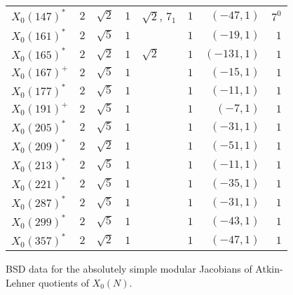 \documentclass{amsart}
\begin{document}
\begin{figure}[tbp]
\begin{tabular}{lllllrrr}
			$X_0(147)^*$     & $2$ & $\sqrt{2}$  & $1$   & $\sqrt{2}$, $7_1$ & $1$ & $(-47, 1)$  & $7^0$  \\
			$X_0(161)^*$     & $2$ & $\sqrt{5}$  & $1$   &                   & $1$ & $(-19, 1)$  & $1$    \\
			$X_0(165)^*$     & $2$ & $\sqrt{2}$  & $1$   & $\sqrt{2}$        & $1$ & $(-131,1)$  & $1$    \\
			$X_0(167)^+$     & $2$ & $\sqrt{5}$  & $1$   &                   & $1$ & $(-15, 1)$  & $1$    \\
			$X_0(177)^*$     & $2$ & $\sqrt{5}$  & $1$   &                   & $1$ & $(-11, 1)$  & $1$    \\
			$X_0(191)^+$     & $2$ & $\sqrt{5}$  & $1$   &                   & $1$ & $(-7,  1)$  & $1$    \\
			$X_0(205)^*$     & $2$ & $\sqrt{5}$  & $1$   &                   & $1$ & $(-31, 1)$  & $1$    \\
			$X_0(209)^*$     & $2$ & $\sqrt{2}$  & $1$   &                   & $1$ & $(-51, 1)$  & $1$    \\
			$X_0(213)^*$     & $2$ & $\sqrt{5}$  & $1$   &                   & $1$ & $(-11, 1)$  & $1$    \\
			$X_0(221)^*$     & $2$ & $\sqrt{5}$  & $1$   &                   & $1$ & $(-35, 1)$  & $1$    \\
			$X_0(287)^*$     & $2$ & $\sqrt{5}$  & $1$   &                   & $1$ & $(-31, 1)$  & $1$    \\
			$X_0(299)^*$     & $2$ & $\sqrt{5}$  & $1$   &                   & $1$ & $(-43, 1)$  & $1$    \\
			$X_0(357)^*$     & $2$ & $\sqrt{2}$  & $1$   &                   & $1$ & $(-47, 1)$  & $1$    \\
			\bottomrule
		\end{tabular}
		\caption{BSD data for the absolutely simple modular Jacobians of Atkin-Lehner quotients of $X_0(N)$.}
		\label{fig:BSDdata}
	\end{figure}
	
\end{document}
